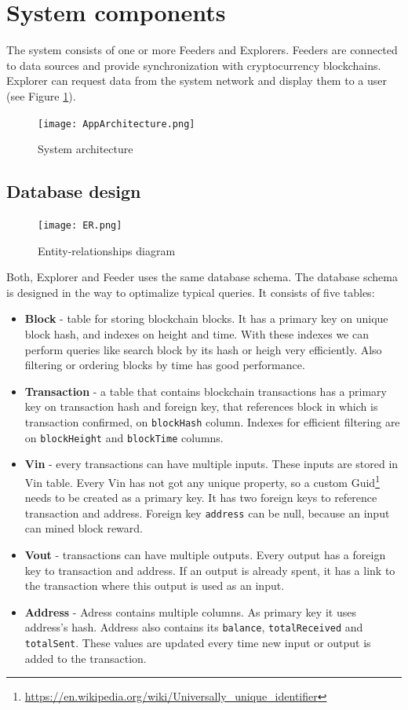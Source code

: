 \section{System components}
The system consists of one or more Feeders and Explorers. Feeders are connected to data sources and provide synchronization with cryptocurrency blockchains. Explorer can request data from the system network and display them to a user (see Figure \ref{systemArchitecture}).

\begin{figure}[h]
    \centering
    \texttt{[image: AppArchitecture.png]}
    \caption{System architecture}
    \label{systemArchitecture}
\end{figure}

\subsection{Database design}
\label{design}

\begin{figure}[h]
    \centering
    \texttt{[image: ER.png]}
    \caption{Entity-relationships diagram}
    \label{er}
\end{figure}

Both, Explorer and Feeder uses the same database schema. The database schema is designed in the way to optimalize typical queries. It consists of five tables:
\begin{itemize}
    \item \textbf{Block} - table for storing blockchain blocks. It has a primary key on unique block hash, and indexes on height and time. With these indexes we can perform queries like search block by its hash or heigh very efficiently. Also filtering or ordering blocks by time has good performance.
    \item \textbf{Transaction} - a table that contains blockchain transactions has a primary key on transaction hash and foreign key, that references block in which is transaction confirmed, on \texttt{blockHash} column. Indexes for efficient filtering are on \texttt{blockHeight} and \texttt{blockTime} columns. 
    \item \textbf{Vin} - every transactions can have multiple inputs. These inputs are stored in Vin table. Every Vin has not got any unique property, so a custom Guid\footnote{\url{https://en.wikipedia.org/wiki/Universally_unique_identifier}} needs to be created as a primary key. It has two foreign keys to reference transaction and address. Foreign key \texttt{address} can be null, because an input can mined block reward.
    \item \textbf{Vout} - transactions can have multiple outputs. Every output has a foreign key to transaction and address. If an output is already spent, it has a link to the transaction where this output is used as an input.
    \item \textbf{Address} - Adress contains multiple columns. As primary key it uses address's hash. Address also contains its \texttt{balance}, \texttt{totalReceived} and \texttt{totalSent}. These values are updated every time new input or output is added to the transaction.  
\end{itemize}



